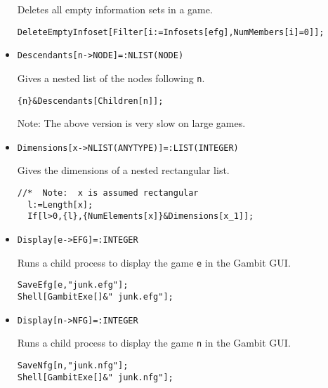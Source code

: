 \begin{itemize}
\bd 
Deletes all empty information sets in a game.  
\begin{verbatim}
DeleteEmptyInfoset[Filter[i:=Infosets[efg],NumMembers[i]=0]];
\end{verbatim} 
\ed

\item{}
\protect \large \begin{verbatim}
Descendants[n->NODE]=:NLIST(NODE)
\end{verbatim}\normalsize

\bd 
Gives a nested list of the nodes following \verb+n+.
\begin{verbatim}
{n}&Descendants[Children[n]];
\end{verbatim} 
\item[Note:] The above version is very slow on large games.
\ed

\item{}
\protect \large \begin{verbatim}
Dimensions[x->NLIST(ANYTYPE)]=:LIST(INTEGER)
\end{verbatim}\normalsize

\bd 
Gives the dimensions of a nested rectangular list. 
\begin{verbatim}
//*  Note:  x is assumed rectangular
  l:=Length[x];
  If[l>0,{l},{NumElements[x]}&Dimensions[x_1]];
\end{verbatim} 
\ed


\item{}
\protect \large \begin{verbatim}
Display[e->EFG]=:INTEGER
\end{verbatim}\normalsize

\bd 
Runs a child process to display the game \verb+e+ in the Gambit GUI. 
\begin{verbatim}
SaveEfg[e,"junk.efg"];
Shell[GambitExe[]&" junk.efg"];
\end{verbatim} 
\ed

\item{}
\protect \large \begin{verbatim}
Display[n->NFG]=:INTEGER
\end{verbatim}\normalsize

\bd 
Runs a child process to display the game \verb+n+ in the Gambit GUI. 
\begin{verbatim}
SaveNfg[n,"junk.nfg"];
Shell[GambitExe[]&" junk.nfg"];
\end{verbatim} 
\ed


\end{itemize}
